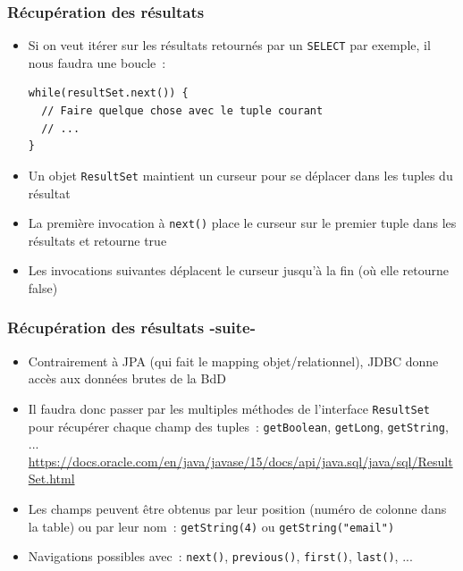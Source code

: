 \documentclass[aspectratio=169,10pt]{beamer}
\begin{document}
\begin{frame}[fragile]
	\frametitle{Récupération des résultats}
	\begin{itemize}
		\item Si on veut itérer sur les résultats retournés par un \texttt{SELECT} par exemple, il nous faudra une boucle~:
\begin{lstlisting}
while(resultSet.next()) {
  // Faire quelque chose avec le tuple courant
  // ...
}
\end{lstlisting}
	\item Un objet 	\texttt{ResultSet} maintient un curseur pour se déplacer dans les tuples du résultat
	\item La première invocation à \texttt{next()} place le curseur sur le premier tuple dans les résultats et retourne true
	\item Les invocations suivantes déplacent le curseur jusqu'à la fin (où elle retourne false)
\end{itemize}
\end{frame}

\begin{frame}[fragile]
\frametitle{Récupération des résultats -suite-}
\begin{itemize}
	\item Contrairement à JPA (qui fait le mapping objet/relationnel), JDBC donne accès aux données brutes de la BdD
	\item Il faudra donc passer par les multiples méthodes de l'interface \texttt{ResultSet} pour récupérer chaque champ des tuples~: \texttt{getBoolean}, \texttt{getLong}, \texttt{getString}, ...\\
	{\tiny \url{https://docs.oracle.com/en/java/javase/15/docs/api/java.sql/java/sql/ResultSet.html}}
	\item Les champs peuvent être obtenus par leur position (numéro de colonne dans la table) ou par leur nom~: \texttt{getString(4)} ou \texttt{getString("email")}
	\item Navigations possibles avec~: \texttt{next()}, \texttt{previous()}, \texttt{first()}, \texttt{last()}, ...
	\end{itemize}
\end{frame}
\end{document}
